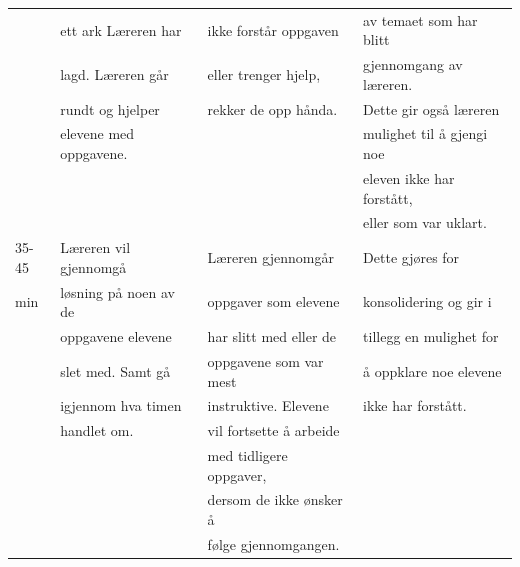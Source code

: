\documentclass[11pt]{article}
\begin{document}
\begin{center}
\begin{tabular}{l|l|l|l}
 & ett ark Læreren har & ikke forstår oppgaven & av temaet som har blitt\\
 & lagd. Læreren går & eller trenger hjelp, & gjennomgang av læreren.\\
 & rundt og hjelper & rekker de opp hånda. & Dette gir også læreren\\
 & elevene med oppgavene. &  & mulighet til å gjengi noe\\
 &  &  & eleven ikke har forstått,\\
 &  &  & eller som  var uklart.\\
\hline
35-45 & Læreren vil gjennomgå & Læreren gjennomgår & Dette gjøres for\\
min & løsning på noen av de & oppgaver som elevene & konsolidering og gir i\\
 & oppgavene elevene & har slitt med eller de & tillegg en mulighet for\\
 & slet med. Samt gå & oppgavene som var mest & å oppklare noe elevene\\
 & igjennom hva timen & instruktive. Elevene & ikke har forstått.\\
 & handlet om. & vil fortsette å arbeide & \\
 &  & med tidligere oppgaver, & \\
 &  & dersom de ikke ønsker å & \\
 &  & følge gjennomgangen. & \\
\end{tabular}
\end{center}
\newpage
\end{document}
